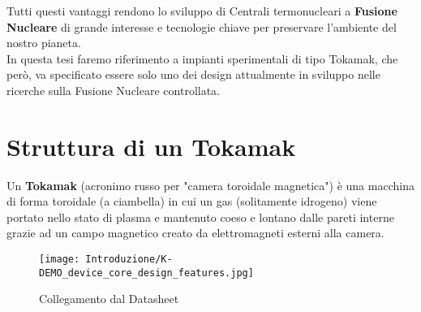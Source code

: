 \noindent
Tutti questi vantaggi rendono lo sviluppo di Centrali termonucleari a \textbf{Fusione Nucleare} di grande interesse e tecnologie chiave per preservare l'ambiente del nostro pianeta.\\
In questa tesi faremo riferimento a impianti sperimentali di tipo Tokamak, che però, va specificato essere solo uno dei design attualmente in sviluppo nelle ricerche sulla Fusione Nucleare controllata.
\newpage

\section*{Struttura di un Tokamak}
Un \textbf{Tokamak} (acronimo russo per "camera toroidale magnetica") è una macchina di forma toroidale (a ciambella) in cui un gas (solitamente idrogeno) viene portato nello stato di plasma e mantenuto coeso e lontano dalle pareti interne grazie ad un campo magnetico creato da elettromagneti esterni alla camera.
\begin{figure}[h]
	\centering
	\texttt{[image: Introduzione/K-DEMO\_device\_core\_design\_features.jpg]}
	\caption[ Schema di collegamento dal Datasheet]{Collegamento dal Datasheet}
\end{figure}

